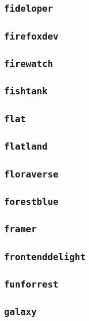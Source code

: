 \subsection{\texttt{fideloper}}
\newpage
\subsection{\texttt{firefoxdev}}
\newpage
\subsection{\texttt{firewatch}}
\newpage
\subsection{\texttt{fishtank}}
\newpage
\subsection{\texttt{flat}}
\newpage
\subsection{\texttt{flatland}}
\newpage
\subsection{\texttt{floraverse}}
\newpage
\subsection{\texttt{forestblue}}
\newpage
\subsection{\texttt{framer}}
\newpage
\subsection{\texttt{frontenddelight}}
\newpage
\subsection{\texttt{funforrest}}
\newpage
\subsection{\texttt{galaxy}}
\newpage
